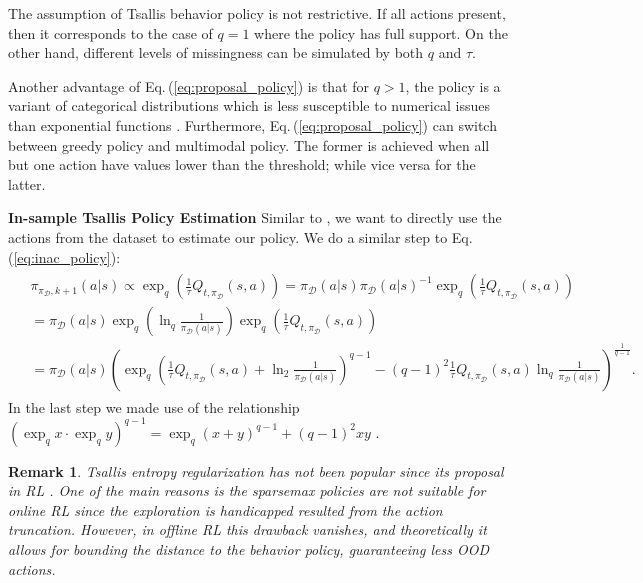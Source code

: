 \documentclass{article}
\newtheorem*{remark}{Remark}
\newcommand{\AdaBracket}[1]{\left(#1\right)}
\newcommand{\expq}[1]{\exp_{q}\!#1}
\newcommand{\eq}[1]{Eq.\,(#1)}
\newcommand{\datasetPolicy}{\pi_{\mathcal{D}}}
\begin{document}
The assumption of Tsallis behavior policy is not restrictive.
If all actions present, then it corresponds to the case of $q=1$ where the policy has full support.
On the other hand, different levels of missingness can be simulated by both $q$ and $\tau$.

Another advantage of \eq{\ref{eq:proposal_policy}} is that for $q>1$, the policy is a variant of categorical distributions which is less susceptible to numerical issues than exponential functions \cite{Tsai2021-selfsupervisedRelativePredictiveCoding}.
Furthermore, \eq{\ref{eq:proposal_policy}} can switch between greedy policy and multimodal policy.
The former is achieved when all but one action have values lower than the threshold; while vice versa for the latter.


\textbf{In-sample Tsallis Policy Estimation}
Similar to \cite{Xiao2023-InSampleSoftmax}, we want to directly use the actions from the dataset to estimate our policy.
We do a similar step to \eq{\ref{eq:inac_policy}}:
\begin{align}
    \begin{split}
        &\pi_{\datasetPolicy, k+1} (a|s) \propto \exp_q \AdaBracket{\frac{1}{\tau} Q_{t, \datasetPolicy}(s,a)} = \datasetPolicy(a|s) \datasetPolicy(a|s)^{-1} \exp_q\AdaBracket{\frac{1}{\tau}Q_{t, \datasetPolicy}(s,a)} \\
        &= \datasetPolicy(a|s)  \exp_q{\AdaBracket{\ln_q{\frac{1}{\datasetPolicy(a|s)}}}} \exp_q\AdaBracket{\frac{1}{\tau}Q_{t, \datasetPolicy}(s,a)}\\
        &=  \datasetPolicy(a|s) {\AdaBracket{ \exp_q\AdaBracket{\frac{1}{\tau}Q_{t, \datasetPolicy}(s,a) + \ln_2\frac{1}{\datasetPolicy(a|s)}}^{q-1} - (q-1)^2 \frac{1}{\tau}Q_{t, \datasetPolicy}(s,a)  \ln_q{\frac{1}{\datasetPolicy(a|s)}} }^{\frac{1}{q-1}}}.
        \label{eq:tsallis_inac_policy_thoery}
    \end{split}
\end{align}
In the last step we made use of the relationship $\AdaBracket{\expq{x}\cdot \expq{y}}^{q-1} = \expq{\AdaBracket{x+y}}^{q-1} + (q-1)^2 xy$ \cite{Yamano2004-properties-qlogexp}.

\begin{remark}
    Tsallis entropy regularization has not been popular since its proposal in RL \cite{Lee2018-TsallisRAL}.
    One of the main reasons is the sparsemax policies are not suitable for online RL since the exploration is handicapped resulted from the action truncation.
    However, in offline RL this drawback vanishes, and theoretically it allows for bounding the distance to the behavior policy, guaranteeing less OOD actions.
\end{remark}
\end{document}
